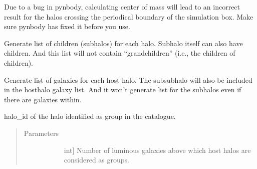 \documentclass[letterpaper,10pt,english]{sphinxmanual}
\begin{document}
\begin{fulllineitems}
\begin{fulllineitems}
Due to a bug in pynbody, calculating center of mass will 
lead to an incorrect result for the halos crossing the 
periodical boundary of the simulation box. Make sure pynbody 
has fixed it before you use.

\end{fulllineitems}


\begin{fulllineitems}
\label{\detokenize{halo_analysis:modules.halo_analysis.halo_props.get_children}}
Generate list of children (subhalos) for each halo.
Subhalo itself can also have children. And this list 
will not contain “grandchildren” (i.e., the children 
of children).

\end{fulllineitems}


\begin{fulllineitems}
\label{\detokenize{halo_analysis:modules.halo_analysis.halo_props.get_galaxy}}
Generate list of galaxies for each host halo. The subsubhalo 
will also be included in the hosthalo galaxy list. And it won’t 
generate list for the subhalos even if there are galaxies within.

\end{fulllineitems}


\begin{fulllineitems}
\label{\detokenize{halo_analysis:modules.halo_analysis.halo_props.get_group_list}}
halo\_id of the halo identified as group in the catalogue.
\begin{quote}\begin{description}
\item[{Parameters}] \leavevmode\begin{description}
\item[{}] \leavevmode{[}int{]}
Number of luminous galaxies above which host halos 
are considered as groups.


\end{description}
\end{description}
\end{quote}
\end{fulllineitems}
\end{fulllineitems}
\end{document}
